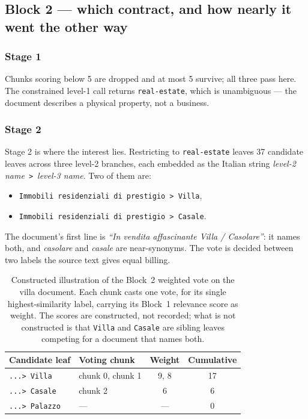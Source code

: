 \subsection{Block 2 --- which contract, and how nearly it went the other way}
\label{sec:examples-contract-a}

\subsubsection{Stage 1}
Chunks scoring below 5 are dropped and at most 5 survive; all three pass here. The constrained level-1 call returns \texttt{real-estate}, which is unambiguous --- the document describes a physical property, not a business.

\subsubsection{Stage 2}
Stage 2 is where the interest lies. Restricting to \texttt{real-estate} leaves 37 candidate leaves across three level-2 branches, each embedded as the Italian string \emph{level-2 name}~\texttt{>}~\emph{level-3 name}. Two of them are:
\begin{itemize}
  \item \texttt{Immobili residenziali di prestigio > Villa},
  \item \texttt{Immobili residenziali di prestigio > Casale}.
\end{itemize}

The document's first line is \emph{``In vendita affascinante Villa / Casolare''}: it names both, and \emph{casolare} and \emph{casale} are near-synonyms. The vote is decided between two labels the source text gives equal billing.

\begin{table}[htbp]
\centering
\small
\begin{tabular}{llcc}
\hline
\textbf{Candidate leaf} & \textbf{Voting chunk} & \textbf{Weight} & \textbf{Cumulative} \\
\hline
\texttt{...> Villa} & chunk 0, chunk 1 & 9, 8 & 17 \\
\texttt{...> Casale} & chunk 2 & 6 & 6 \\
\texttt{...> Palazzo} & --- & --- & 0 \\
\hline
\end{tabular}
\caption{Constructed illustration of the Block~2 weighted vote on the villa document. Each chunk casts one vote, for its single highest-similarity label, carrying its Block~1 relevance score as weight. The scores are constructed, not recorded; what is not constructed is that \texttt{Villa} and \texttt{Casale} are sibling leaves competing for a document that names both.}
\label{tab:block2-vote}
\end{table}


